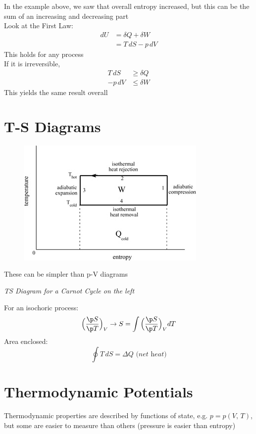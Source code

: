 \documentclass[a4paper, 11pt, normalem]{report}
\begin{document}
In the example above, we saw that overall entropy increased, but this can be the sum of an increasing and decreasing part \\
Look at the First Law:
\begin{align*}
    dU &= \delta Q + \delta W \\
       &= T\,dS - p\,dV
\end{align*}
This holds for any process \\
If it is irreversible,
\begin{align*}
    T\,dS &\geq \delta Q \\
    -p\,dV &\leq \delta W
\end{align*}
This yields the same result overall

\section{T-S Diagrams}
\begin{figure}
    \begin{center}
        \includegraphics[scale=0.4]{TSDiag.png}
        \vspace{-30pt}
    \end{center}
\end{figure}

These can be simpler than p-V diagrams

\textit{TS Diagram for a Carnot Cycle on the left}

For an isochoric process:
\begin{equation*}
    \Big(\frac{\p S}{\p T} \Big)_V \to S = \int \Big(\frac{\p S}{\p T} \Big)_V dT
\end{equation*}
Area enclosed:
\begin{equation*}
    \oint T\,dS = \Delta Q \textit{ (net heat)}
\end{equation*}

\section{Thermodynamic Potentials}
Thermodynamic properties are described by functions of state, e.g. $p = p(V,\,T)$, but some are easier to measure than others (pressure is easier than entropy)
\end{document}
